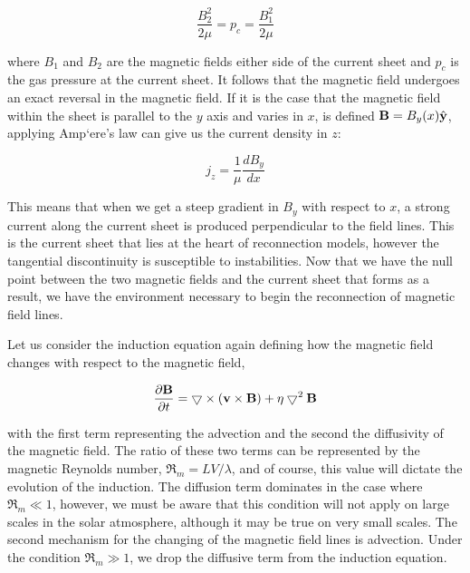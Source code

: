 \begin{equation}
	\frac{B_2^2}{2\mu} = p_c = \frac{B_1^2}{2\mu}
\end{equation}

\noindent where $B_1$ and $B_2$ are the magnetic fields either side of the current sheet and $p_c$ is the gas pressure at the current sheet.
It follows that the magnetic field undergoes an exact reversal in the magnetic field.
If it is the case that the magnetic field within the sheet is parallel to the $y$ axis and varies in $x$, is defined $\mathbf{B} = B_y(x)\hat{\mathbf{y}}$, applying Amp{`e}re's law can give us the current density in $z$:

\begin{equation}
	j_z = \frac{1}{\mu}\frac{dB_y}{dx}
\end{equation}

\noindent This means that when we get a steep gradient in $B_y$ with respect to $x$, a strong current along the current sheet is produced perpendicular to the field lines.
This is the current sheet that lies at the heart of reconnection models, however the tangential discontinuity is susceptible to instabilities.
Now that we have the null point between the two magnetic fields and the current sheet that forms as a result, we have the environment necessary to begin the reconnection of magnetic field lines.

Let us consider the induction equation again defining how the magnetic field changes with respect to the magnetic field,

\begin{equation}
	\frac{\partial \mathbf{B}}{\partial t } = \bigtriangledown \times (\mathbf{v} \times \mathbf{B}) + \eta\bigtriangledown^2\mathbf{B}
\end{equation} 

\noindent with the first term representing the advection and the second the diffusivity of the magnetic field.
The ratio of these two terms can be represented by the magnetic Reynolds number, $\Re_m = LV/\lambda$, and of course, this value will dictate the evolution of the induction.
The diffusion term dominates in the case where $\Re_m \ll 1$, however, we must be aware that this condition will not apply on large scales in the solar atmosphere, although it may be true on very small scales.
The second mechanism for the changing of the magnetic field lines is advection. 
Under the condition $\Re_m \gg 1$, we drop the diffusive term from the induction equation.






